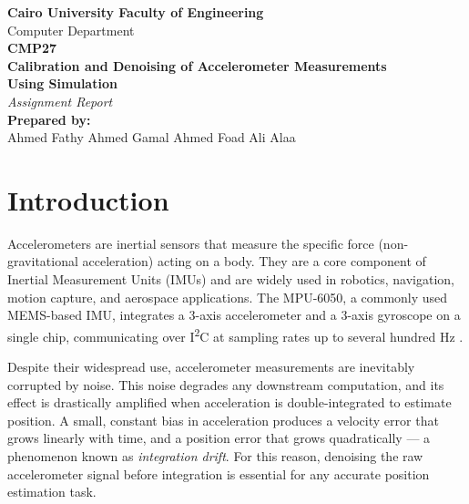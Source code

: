 \documentclass[12pt,a4paper]{article}
\begin{document}
\begin{titlepage}
    \centering
    \vspace*{1in}
    
    {\LARGE \textbf{Cairo University Faculty of Engineering}} \\[0.5cm]
    {\Large Computer Department} \\[0.5cm]
    {\large \textbf{CMP27}} \\[2in]
    
    {\huge \textbf{Calibration and Denoising of Accelerometer Measurements}} \\[0.5cm]
    {\huge \textbf{Using Simulation}} \\[0.5cm]
    {\Large \textit{Assignment Report}} \\[2in]
    
    {\Large \textbf{Prepared by:}} \\[0.5cm]
    {\Large Ahmed Fathy \qquad Ahmed Gamal \qquad Ahmed Foad \qquad Ali Alaa} \\[1.3in]    
    \vfill
\end{titlepage}
\tableofcontents
\newpage

\section{Introduction}

Accelerometers are inertial sensors that measure the specific force (non-gravitational acceleration) acting on a body. They are a core component of Inertial Measurement Units (IMUs) and are widely used in robotics, navigation, motion capture, and aerospace applications. The MPU-6050, a commonly used MEMS-based IMU, integrates a 3-axis accelerometer and a 3-axis gyroscope on a single chip, communicating over I\textsuperscript{2}C at sampling rates up to several hundred Hz \cite{nirmala2016}.

Despite their widespread use, accelerometer measurements are inevitably corrupted by noise. This noise degrades any downstream computation, and its effect is drastically amplified when acceleration is double-integrated to estimate position. A small, constant bias in acceleration produces a velocity error that grows linearly with time, and a position error that grows quadratically — a phenomenon known as \textit{integration drift}. For this reason, denoising the raw accelerometer signal before integration is essential for any accurate position estimation task.
\end{document}
